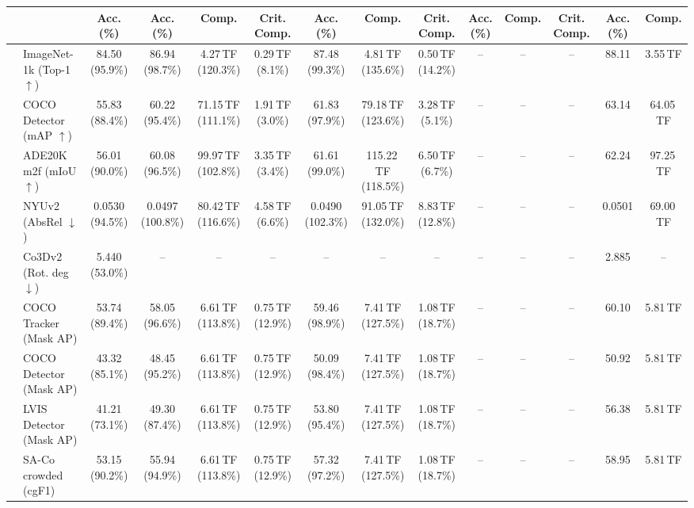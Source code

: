\begin{table}[t]
\begin{center}
\begin{small}
\begin{sc}
{\begin{tabular}{llcccccccccccc}
\cmidrule(lr){3-3} \cmidrule(lr){4-6} \cmidrule(lr){7-9} \cmidrule(lr){10-12} \cmidrule(lr){13-14}
& & Acc. (\%) & Acc. (\%) & Comp. & Crit. Comp. & Acc. (\%) & Comp. & Crit. Comp. & Acc. (\%) & Comp. & Crit. Comp. & Acc. (\%) & Comp. \\
\midrule
{}
& ImageNet-1k (Top-1 $\uparrow$) & 84.50 (95.9\%) & 86.94 (98.7\%) & 4.27\,TF (120.3\%) & 0.29\,TF (8.1\%) & 87.48 (99.3\%) & 4.81\,TF (135.6\%) & 0.50\,TF (14.2\%) & -- & -- & -- & 88.11 & 3.55\,TF \\
& COCO Detector (mAP $\uparrow$) & 55.83 (88.4\%) & 60.22 (95.4\%) & 71.15\,TF (111.1\%) & 1.91\,TF (3.0\%) & 61.83 (97.9\%) & 79.18\,TF (123.6\%) & 3.28\,TF (5.1\%) & -- & -- & -- & 63.14 & 64.05\,TF \\
& ADE20K m2f (mIoU $\uparrow$) & 56.01 (90.0\%) & 60.08 (96.5\%) & 99.97\,TF (102.8\%) & 3.35\,TF (3.4\%) & 61.61 (99.0\%) & 115.22\,TF (118.5\%) & 6.50\,TF (6.7\%) & -- & -- & -- & 62.24 & 97.25\,TF \\
& NYUv2 (AbsRel $\downarrow$) & 0.0530 (94.5\%) & 0.0497 (100.8\%) & 80.42\,TF (116.6\%) & 4.58\,TF (6.6\%) & 0.0490 (102.3\%) & 91.05\,TF (132.0\%) & 8.83\,TF (12.8\%) & -- & -- & -- & 0.0501 & 69.00\,TF \\
& Co3Dv2 (Rot. deg $\downarrow$) & 5.440 (53.0\%) & -- & -- & -- & -- & -- & -- & -- & -- & -- & 2.885 & -- \\
\midrule
{}
& COCO Tracker (Mask AP) & 53.74 (89.4\%) & 58.05 (96.6\%) & 6.61\,TF (113.8\%) & 0.75\,TF (12.9\%) & 59.46 (98.9\%) & 7.41\,TF (127.5\%) & 1.08\,TF (18.7\%) & -- & -- & -- & 60.10 & 5.81\,TF \\
& COCO Detector (Mask AP) & 43.32 (85.1\%) & 48.45 (95.2\%) & 6.61\,TF (113.8\%) & 0.75\,TF (12.9\%) & 50.09 (98.4\%) & 7.41\,TF (127.5\%) & 1.08\,TF (18.7\%) & -- & -- & -- & 50.92 & 5.81\,TF \\
& LVIS Detector (Mask AP) & 41.21 (73.1\%) & 49.30 (87.4\%) & 6.61\,TF (113.8\%) & 0.75\,TF (12.9\%) & 53.80 (95.4\%) & 7.41\,TF (127.5\%) & 1.08\,TF (18.7\%) & -- & -- & -- & 56.38 & 5.81\,TF \\
& SA-Co crowded (cgF1) & 53.15 (90.2\%) & 55.94 (94.9\%) & 6.61\,TF (113.8\%) & 0.75\,TF (12.9\%) & 57.32 (97.2\%) & 7.41\,TF (127.5\%) & 1.08\,TF (18.7\%) & -- & -- & -- & 58.95 & 5.81\,TF \\

\end{tabular}}
\end{sc}
\end{small}
\end{center}
\end{table}
